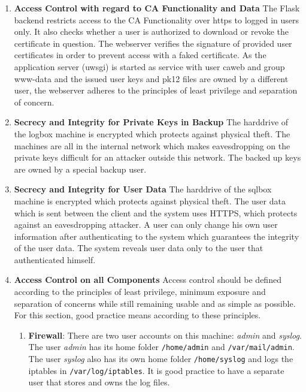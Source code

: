 \documentclass[english]{article}
\begin{document}
\begin{enumerate}

\item \textbf{Access Control with regard to CA Functionality and Data}
The Flask backend restricts access to the CA Functionality over https to logged in users only. It also checks whether a user is authorized to download or revoke the certificate in question. The webserver verifies the signature of provided user certificates in order to prevent access with a faked certificate. As the application server (uwsgi) is started as service with user caweb and group www-data and the issued user keys and pk12 files are owned by a different user, the webserver adheres to the principles of least privilege and separation of concern.

\item \textbf{Secrecy and Integrity for Private Keys in Backup}
  The harddrive of the logbox machine is encrypted which protects against physical theft. The machines are all in the internal network which makes eavesdropping on the private keys difficult for an attacker outside this network. The backed up keys are owned by a special backup user.
  
\item \textbf{Secrecy and Integrity for User Data}
  The harddrive of the sqlbox machine is encrypted which protects against physical theft. The user data which is sent between the client and the system uses HTTPS, which protects against an eavesdropping attacker. A user can only change his own user information after authenticating to the system which guarantees the integrity of the user data. The system reveals user data only to the user that authenticated himself.
\item \textbf{Access Control on all Components}
Access control should be defined according to the principles of least privilege, minimum exposure and separation of concerns while still remaining usable and as simple as possible. For this section, good practice means according to these principles.
\begin{enumerate}[label=(\alph*)]
\item \textbf{Firewall}: There are two user accounts on this machine: \textit{admin} and \textit{syslog}. The user \textit{admin} has its home folder \texttt{/home/admin} and \texttt{/var/mail/admin}. The user \textit{syslog} also has its own home folder \texttt{/home/syslog} and logs the iptables in \texttt{/var/log/iptables}. It is good practice to have a separate user that stores and owns the log files.


\end{enumerate}
\end{enumerate}
\end{document}
